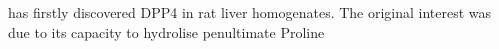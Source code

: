 \citet{Hopsu-Havu1966} has firstly discovered DPP4 in rat liver homogenates. The original interest was due to its capacity to hydrolise penultimate Proline 